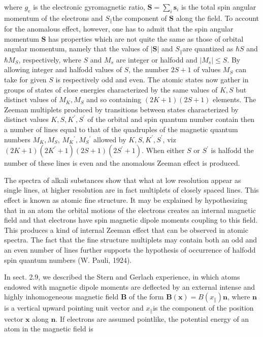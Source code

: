\documentclass{article}
\begin{document}
where $g_{e}$ is the electronic gyromagnetic ratio, $\boldsymbol{S}=\sum_{i} \boldsymbol{s}_{i}$ is the total spin angular momentum of the electrons and $S_{\|}$the component of $\boldsymbol{S}$ along the field. To account for the anomalous effect, however, one has to admit that the spin angular momentum $\boldsymbol{S}$ has properties which are not quite the same as those of orbital angular momentum, namely that the values of $|\boldsymbol{S}|$ and $S_{\|}$are quantized as $\hbar S$
and $\hbar M_{S}$, respectively, where $S$ and $M_{s}$ are integer or halfodd and $\left|M_{s}\right| \leq S$. By allowing integer and halfodd values of $S$, the number $2 S+1$ of values $M_{S}$ can take for given $S$ is respectively odd and even. The atomic states now gather in groups of states of close energies characterized by the same values of $K, S$ but distinct values of $M_{K}, M_{S}$ and so containing $(2 K+1)(2 S+1)$ elements. The Zeeman multiplets produced by transitions between states characterized by distinct values $K, S, K^{\prime}, S^{\prime}$ of the orbital and spin quantum number contain then a number of lines equal to that of the quadruples of the magnetic quantum numbers $M_{K}, M_{S}$, $M_{K}{ }^{\prime}, M_{S}{ }^{\prime}$ allowed by $K, S, K^{\prime}, S^{\prime}$, viz $(2 K+1)\left(2 K^{\prime}+1\right)(2 S+1)\left(2 S^{\prime}+1\right)$. When either $S$ or $S^{\prime}$ is halfodd the number of these lines is even and the anomalous Zeeman effect is produced.

The spectra of alkali substances show that what at low resolution appear as single lines, at higher resolution are in fact multiplets of closely spaced lines. This effect is known as atomic fine structure. It may be explained by hypothesizing that in an atom the orbital motions of the electrons creates an internal magnetic field and that electrons have spin magnetic dipole moments coupling to this field. This produces a kind of internal Zeeman effect that can be observed in atomic spectra. The fact that the fine structure multiplets may contain both an odd and an even number of lines further supports the hypothesis of occurrence of halfodd spin quantum numbers (W. Pauli, 1924).

In sect. 2.9, we described the Stern and Gerlach experience, in which atoms endowed with magnetic dipole moments are deflected by an external intense and highly inhomogeneous magnetic field $\boldsymbol{B}$ of the form $\boldsymbol{B}(\boldsymbol{x})=B\left(x_{\|}\right) \boldsymbol{n}$, where $\boldsymbol{n}$ is a vertical upward pointing unit vector and $x_{\|}$is the component of the position vector $\boldsymbol{x}$ along $\boldsymbol{n}$. If electrons are assumed pointlike, the potential energy of an atom in the magnetic field is
 
\end{document}
